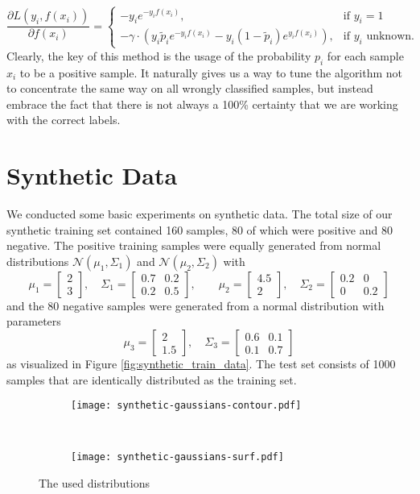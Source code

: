 \begin{equation*}
 \frac{\partial L(y_i,f(x_i))}{\partial f(x_i)} = 
    \begin{cases}
	-y_i e^{-y_i f(x_i)}, & \text{if $y_i = 1$}\\
	-\gamma \cdot \left(y_i \tilde p_i e^{-y_i f(x_i)} - y_i (1 - \tilde p_i) e^{y_i f(x_i)} \right), & \text{if $y_i$ unknown.}
      \end{cases}
\end{equation*}
Clearly, the key of this method is the usage of the probability $p_i$ for each sample $x_i$ to be a positive sample. 
It naturally gives us a way to tune the algorithm not to concentrate the same way on all wrongly classified samples, but instead embrace the fact that there is not always a 100\% certainty that we are working with the correct labels.

\section{Synthetic Data}
We conducted some basic experiments on synthetic data. 
The total size of our synthetic training set contained 160 samples, 80 of which were positive and 80 negative. 
The positive training samples were equally generated from normal distributions $\mathcal{N}(\mu_1,\Sigma_1)$ and $\mathcal{N}(\mu_2, \Sigma_2)$ with 
$$\mu_1= \begin{bmatrix}2 \\ 3 \end{bmatrix}, \quad \Sigma_1 = \begin{bmatrix}0.7 & 0.2 \\ 0.2 & 0.5 \end{bmatrix}, \qquad \mu_2 = \begin{bmatrix}4.5 \\ 2 \end{bmatrix}, \quad \Sigma_2 = \begin{bmatrix} 0.2 & 0 \\ 0 & 0.2 \end{bmatrix}$$
and the 80 negative samples were generated from a normal distribution with parameters 
$$\mu_3 = \begin{bmatrix} 2\\1.5\end{bmatrix}, \quad \Sigma_3 = \begin{bmatrix}0.6 & 0.1\\ 0.1 & 0.7\end{bmatrix}$$
as visualized in Figure \ref{fig:synthetic_train_data}. The test set consists of 1000 samples that are identically distributed as the training set.
\begin{figure}[ht]
	\centering
	\begin{subfigure}[h]{0.45\textwidth}
	\texttt{[image: synthetic-gaussians-contour.pdf]}	
	\end{subfigure}
	~
	\begin{subfigure}[h]{0.45\textwidth}
	\texttt{[image: synthetic-gaussians-surf.pdf]}	
	\end{subfigure}
	\caption{The used distributions}
	\label{fig:synthetic-gaussians}
\end{figure}

